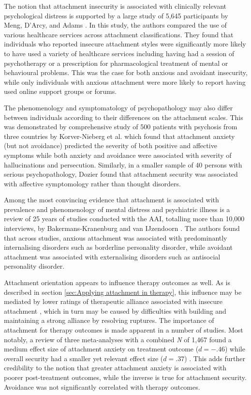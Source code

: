 \documentclass[12pt]{report}
\begin{document}
The notion that attachment insecurity is associated with clinically relevant psychological distress is supported by a large study of 5,645 participants by Meng, D'Arcy, and Adams \citeyear{Meng2015}.
In this study, the authors compared the use of various healthcare services across attachment classifications. They found that individuals who reported insecure attachment styles were significantly more likely to have used a variety of healthcare services including having had a session of psychotherapy or a prescription for pharmacological treatment of mental or behavioural problems. This was the case for both anxious and avoidant insecurity, while only individuals with anxious attachment were more likely to report having used online support groups or forums.

The phenomenology and symptomatology of psychopathology may also differ between individuals according to their differences on the attachment scales.
This was demonstrated by comprehensive study of 500 patients with psychosis from three countries by Korver-Nieberg et al. \citeyear{Korver-Nieberg2015} which found that attachment anxiety (but not avoidance) predicted the severity of both positive and affective symptoms while both anxiety and avoidance were associated with severity of hallucinations and persecution.
Similarly, in a smaller sample of 40 persons with serious psychopathology, Dozier \citeyear{Dozier1990} found that attachment security was associated with affective symptomology rather than thought disorders.

Among the most convincing evidence that attachment is associated with prevalence and phenomenology of mental distress and psychiatric illness is a review of 25 years of studies conducted with the AAI, totalling more than 10,000 interviews, by Bakermans-Kranenburg and van IJzendoorn \citeyear{Bakermanskranenburg2009}.
The authors found that across studies, anxious attachment was associated with predominantly internalising disorders such as borderline personality disorder, while avoidant attachment was associated with externalising disorders such as antisocial personality disorder.

Attachment orientation appears to influence therapy outcomes as well.
As is described in section \ref{sec:Applying attachment in therapy}, this influence may be mediated by lower ratings of therapeutic alliance associated with insecure attachment \cite{Baier2020}, which in turn may be caused by difficulties with building and maintaining a strong alliance by resolving ruptures.
The importance of attachment for therapy outcomes is made apparent in a number of studies. Most notably, a review of three meta-analyses with a combined \textit{N} of 1,467 found a medium effect size of attachment anxiety on treatment outcome ($d=-.46$) while overall security had a smaller yet relevant effect size ($d=.37$) \cite{Levy2011}. This adds further credibility to the notion that greater attachment anxiety is associated with poorer post-treatment outcomes, while the inverse is true for attachment security. Avoidance was not significantly correlated with therapy outcomes.
\end{document}
